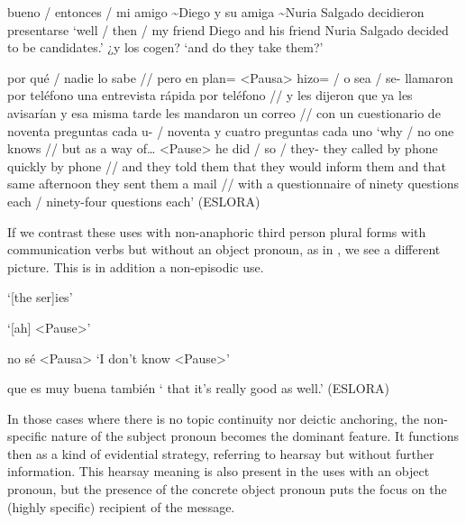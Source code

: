 \documentclass[output=paper]{langscibook}
\begin{document}
\ea\label{ex:pierre:19}
\begin{xlist}[Speaker 2]
 bueno / entonces / mi amigo {\textasciitilde}Diego y su amiga {\textasciitilde}Nuria Salgado decidieron presentarse
 ‘well / then / my friend Diego and his friend Nuria Salgado decided to be candidates.’
 ¿y los cogen? 
 ‘and do they take them?’

 por qué / nadie lo sabe // pero en plan=  <Pausa> hizo= / o sea / se- llamaron por teléfono {}{ {una entrevista rápida por teléfono // y les dijeron que ya les avisarían y esa misma tarde les mandaron un correo // con un cuestionario de noventa preguntas cada u- / noventa y cuatro preguntas cada uno}} 
 ‘why / no one knows // but as a way of… <Pause> he did / so / they- they called by phone {  } {quickly by phone // and they told them that they would inform them and that same afternoon they sent them a mail // with a questionnaire of ninety questions each / ninety-four questions each’ (ESLORA)}
\end{xlist}
\z 

If we contrast these uses with non-anaphoric third person plural forms with communication verbs but without an object pronoun, as in , we see a different picture. This is in addition a non-episodic use.


\ea\label{ex:pierre:20}
\begin{xlist}[Speaker 2]
 ‘[the ser]ies’

 ‘[ah] <Pause>’

 no sé  <Pausa>
 ‘I don’t know  <Pause>’

  que es muy buena también
 ‘  that it’s really good as well.’ (ESLORA)
\end{xlist}
\z 

In those cases where there is no topic continuity nor deictic anchoring, the non-specific nature of the subject pronoun becomes the dominant feature. It functions then as a kind of evidential strategy, referring to hearsay but without further information. This hearsay meaning is also present in the uses with an object pronoun, but the presence of the concrete object pronoun puts the focus on the (highly specific) recipient of the message.
\end{document}
